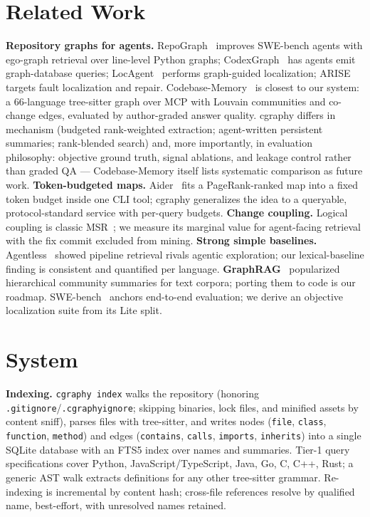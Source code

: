 \documentclass[11pt]{article}
\begin{document}
\section{Related Work}
\textbf{Repository graphs for agents.} RepoGraph~\cite{repograph} improves
SWE-bench agents with ego-graph retrieval over line-level Python graphs;
CodexGraph~\cite{codexgraph} has agents emit graph-database queries;
LocAgent~\cite{locagent} performs graph-guided localization;
ARISE~\cite{arise} targets fault localization and repair.
Codebase-Memory~\cite{codebasememory} is closest to our system: a
66-language tree-sitter graph over MCP with Louvain communities and
co-change edges, evaluated by author-graded answer quality. cgraphy differs
in mechanism (budgeted rank-weighted extraction; agent-written persistent
summaries; rank-blended search) and, more importantly, in evaluation
philosophy: objective ground truth, signal ablations, and leakage control
rather than graded QA --- Codebase-Memory itself lists systematic
comparison as future work. \textbf{Token-budgeted maps.}
Aider~\cite{aider} fits a PageRank-ranked map into a fixed token budget
inside one CLI tool; cgraphy generalizes the idea to a queryable,
protocol-standard service with per-query budgets. \textbf{Change coupling.}
Logical coupling is classic MSR~\cite{gall,zimmermann}; we measure its
marginal value for agent-facing retrieval with the fix commit excluded from
mining. \textbf{Strong simple baselines.} Agentless~\cite{agentless}
showed pipeline retrieval rivals agentic exploration; our lexical-baseline
finding is consistent and quantified per language.
\textbf{GraphRAG}~\cite{graphrag} popularized hierarchical community
summaries for text corpora; porting them to code is our roadmap.
SWE-bench~\cite{swebench} anchors end-to-end evaluation; we derive an
objective localization suite from its Lite split.

\section{System}\label{sec:system}
\textbf{Indexing.} \texttt{cgraphy index} walks the repository (honoring
\texttt{.gitignore}/\texttt{.cgraphyignore}; skipping binaries, lock files,
and minified assets by content sniff), parses files with tree-sitter, and
writes nodes (\texttt{file}, \texttt{class}, \texttt{function},
\texttt{method}) and edges (\texttt{contains}, \texttt{calls},
\texttt{imports}, \texttt{inherits}) into a single SQLite database with an
FTS5 index over names and summaries. Tier-1 query specifications cover
Python, JavaScript/TypeScript, Java, Go, C, C++, Rust; a generic AST walk
extracts definitions for any other tree-sitter grammar. Re-indexing is
incremental by content hash; cross-file references resolve by qualified
name, best-effort, with unresolved names retained.
\end{document}

